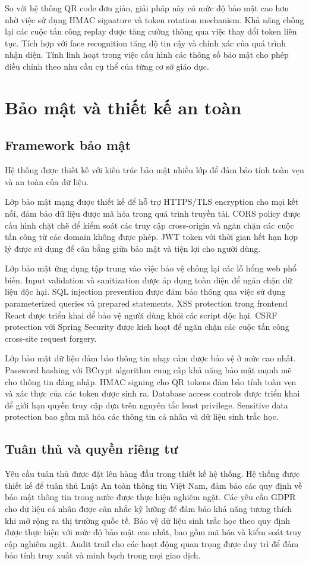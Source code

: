 \documentclass[12pt,a4paper]{report}
\begin{document}
So với hệ thống QR code đơn giản, giải pháp này có mức độ bảo mật cao hơn nhờ việc sử dụng HMAC signature và token rotation mechanism. Khả năng chống lại các cuộc tấn công replay được tăng cường thông qua việc thay đổi token liên tục. Tích hợp với face recognition tăng độ tin cậy và chính xác của quá trình nhận diện. Tính linh hoạt trong việc cấu hình các thông số bảo mật cho phép điều chỉnh theo nhu cầu cụ thể của từng cơ sở giáo dục.

\section{Bảo mật và thiết kế an toàn}
\subsection{Framework bảo mật}
Hệ thống được thiết kế với kiến trúc bảo mật nhiều lớp để đảm bảo tính toàn vẹn và an toàn của dữ liệu. 

Lớp bảo mật mạng được thiết kế để hỗ trợ HTTPS/TLS encryption cho mọi kết nối, đảm bảo dữ liệu được mã hóa trong quá trình truyền tải. CORS policy được cấu hình chặt chẽ để kiểm soát các truy cập cross-origin và ngăn chặn các cuộc tấn công từ các domain không được phép. JWT token với thời gian hết hạn hợp lý được sử dụng để cân bằng giữa bảo mật và tiện lợi cho người dùng.

Lớp bảo mật ứng dụng tập trung vào việc bảo vệ chống lại các lỗ hổng web phổ biến. Input validation và sanitization được áp dụng toàn diện để ngăn chặn dữ liệu độc hại. SQL injection prevention được đảm bảo thông qua việc sử dụng parameterized queries và prepared statements. XSS protection trong frontend React được triển khai để bảo vệ người dùng khỏi các script độc hại. CSRF protection với Spring Security được kích hoạt để ngăn chặn các cuộc tấn công cross-site request forgery.

Lớp bảo mật dữ liệu đảm bảo thông tin nhạy cảm được bảo vệ ở mức cao nhất. Password hashing với BCrypt algorithm cung cấp khả năng bảo mật mạnh mẽ cho thông tin đăng nhập. HMAC signing cho QR tokens đảm bảo tính toàn vẹn và xác thực của các token được sinh ra. Database access controls được triển khai để giới hạn quyền truy cập dựa trên nguyên tắc least privilege. Sensitive data protection bao gồm mã hóa các thông tin cá nhân và dữ liệu sinh trắc học.

\subsection{Tuân thủ và quyền riêng tư}
Yêu cầu tuân thủ được đặt lên hàng đầu trong thiết kế hệ thống. Hệ thống được thiết kế để tuân thủ Luật An toàn thông tin Việt Nam, đảm bảo các quy định về bảo mật thông tin trong nước được thực hiện nghiêm ngặt. Các yêu cầu GDPR cho dữ liệu cá nhân được cân nhắc kỹ lưỡng để đảm bảo khả năng tương thích khi mở rộng ra thị trường quốc tế. Bảo vệ dữ liệu sinh trắc học theo quy định được thực hiện với mức độ bảo mật cao nhất, bao gồm mã hóa và kiểm soát truy cập nghiêm ngặt. Audit trail cho các hoạt động quan trọng được duy trì để đảm bảo tính truy xuất và minh bạch trong mọi giao dịch.
\end{document}
